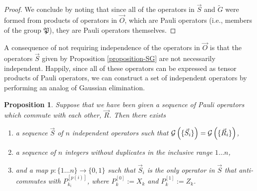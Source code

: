 \documentclass[twocolumn,showpacs,preprintnumbers,amsmath,amssymb,nofootinbib,pra,floatfix]{revtex4-1}
\newtheorem{proposition}{Proposition}
\newenvironment{remark}[1][Remark]{\begin{trivlist}
\item[\hskip \labelsep {\bfseries #1}]}{\end{trivlist}}
\newcommand{\lst}{\vec}
\newcommand{\set}{\tilde}
\newcommand{\genfun}{\mathcal{G}}
\newcommand{\pauligroup}{\mathfrak{P}}
\begin{document}
\begin{proof}
We conclude by noting that since all of the operators in $\lst S$ and $\set G$ were formed from products of operators in $\lst O$, which are Pauli operators (i.e., members of the group $\pauligroup$), they are Pauli operators themselves.
\end{proof}
\begin{remark}
A consequence of not requiring independence of the operators in $\lst O$ is that the operators $\lst S$ given by Proposition \ref{proposition-SG} are not necessarily independent.  Happily, since all of these operators can be expressed as tensor products of Pauli operators, we can construct a set of independent operators by performing an analog of Gaussian elimination.
\end{remark}

\begin{proposition}
\label{make-independent-using-elimination}
Suppose that we have been given a sequence of Pauli operators which commute with each other, $\lst R$.  Then there exists
\begin{enumerate}
\item a sequence $\lst S$ of $n$ independent operators such that $\genfun\paren{\{\lst S_i\}}=\genfun\paren{\{\lst R_i\}}$,
\item a sequence of $n$ integers without duplicates in the inclusive range $1\dots n$,
\item and a map $p:\{1\dots n\} \to \{0,1\}$ such that $\lst S_i$ is the only operator in $\lst S$ that anti-commutes with $P_{k_i}^{[p(i)]}$, where $P_k^{[0]}:=X_k$ and $P_k^{[1]}:=Z_k$.
\end{enumerate}
\end{proposition}
\end{document}
